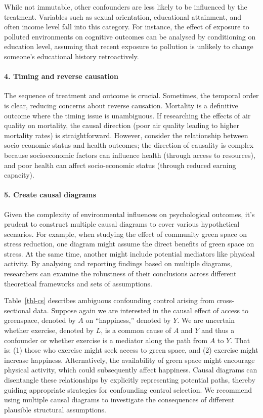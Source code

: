 \documentclass[
  singlecolumn]{article}
\let\oldparagraph\paragraph
\renewcommand{\paragraph}[1]{\oldparagraph{#1}\mbox{}}
\begin{document}
While not immutable, other confounders are less likely to be influenced
by the treatment. Variables such as sexual orientation, educational
attainment, and often income level fall into this category. For
instance, the effect of exposure to polluted environments on cognitive
outcomes can be analysed by conditioning on education level, assuming
that recent exposure to pollution is unlikely to change someone's
educational history retroactively.

\paragraph{4. Timing and reverse
causation}\label{timing-and-reverse-causation}

The sequence of treatment and outcome is crucial. Sometimes, the
temporal order is clear, reducing concerns about reverse causation.
Mortality is a definitive outcome where the timing issue is unambiguous.
If researching the effects of air quality on mortality, the causal
direction (poor air quality leading to higher mortality rates) is
straightforward. However, consider the relationship between
socio-economic status and health outcomes; the direction of causality is
complex because socioeconomic factors can influence health (through
access to resources), and poor health can affect socio-economic status
(through reduced earning capacity).

\paragraph{5. Create causal diagrams}\label{create-causal-diagrams}

Given the complexity of environmental influences on psychological
outcomes, it's prudent to construct multiple causal diagrams to cover
various hypothetical scenarios. For example, when studying the effect of
community green space on stress reduction, one diagram might assume the
direct benefits of green space on stress. At the same time, another
might include potential mediators like physical activity. By analysing
and reporting findings based on multiple diagrams, researchers can
examine the robustness of their conclusions across different theoretical
frameworks and sets of assumptions.

Table~\ref{tbl-cs} describes ambiguous confounding control arising from
cross-sectional data. Suppose again we are interested in the causal
effect of access to greenspace, denoted by \(A\) on ``happiness,''
denoted by \(Y\). We are uncertain whether exercise, denoted by \(L\),
is a common cause of \(A\) and \(Y\) and thus a confounder or whether
exercise is a mediator along the path from \(A\) to \(Y\). That is: (1)
those who exercise might seek access to green space, and (2) exercise
might increase happiness. Alternatively, the availability of green space
might encourage physical activity, which could subsequently affect
happiness. Causal diagrams can disentangle these relationships by
explicitly representing potential paths, thereby guiding appropriate
strategies for confounding control selection. We recommend using
multiple causal diagrams to investigate the consequences of different
plausible structural assumptions.
\end{document}
